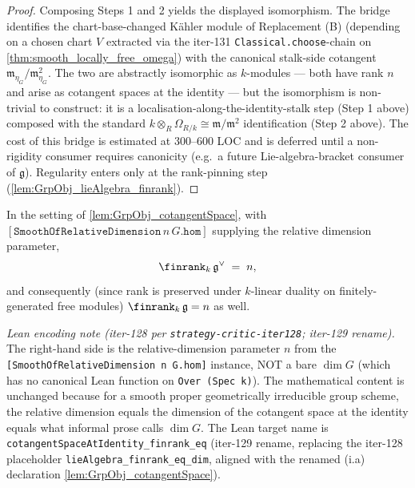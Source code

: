 \begin{proof}
  Composing Steps 1 and 2 yields the displayed isomorphism. The bridge identifies the chart-base-changed Kähler module of Replacement (B) (depending on a chosen chart \(V\) extracted via the iter-131 \texttt{Classical.choose}-chain on \cref{thm:smooth_locally_free_omega}) with the canonical stalk-side cotangent \(\mathfrak m_{\eta_G} / \mathfrak m_{\eta_G}^{2}\). The two are abstractly isomorphic as \(k\)-modules — both have rank \(n\) and arise as cotangent spaces at the identity — but the isomorphism is non-trivial to construct: it is a localisation-along-the-identity-stalk step (Step 1 above) composed with the standard \(k \otimes_{R} \Omega_{R/k} \cong \mathfrak m / \mathfrak m^{2}\) identification (Step 2 above). The cost of this bridge is estimated at 300--600 LOC and is deferred until a non-rigidity consumer requires canonicity (e.g.\ a future Lie-algebra-bracket consumer of \(\mathfrak g\)). Regularity enters only at the rank-pinning step (\cref{lem:GrpObj_lieAlgebra_finrank}).
\end{proof}

\begin{lemma}
  \label{lem:GrpObj_lieAlgebra_finrank}
  
  In the setting of \cref{lem:GrpObj_cotangentSpace}, with \([\mathtt{SmoothOfRelativeDimension}\,n\,G.\mathtt{hom}]\) supplying the relative dimension parameter,
  \[
    \finrank_{k}\,\mathfrak g^{\vee} \;=\; n,
  \]
  and consequently (since rank is preserved under \(k\)-linear duality on finitely-generated free modules) \(\finrank_{k}\,\mathfrak g = n\) as well.

  \emph{Lean encoding note (iter-128 per \texttt{strategy-critic-iter128}; iter-129 rename).} The right-hand side is the relative-dimension parameter \(n\) from the \texttt{[SmoothOfRelativeDimension n G.hom]} instance, NOT a bare \(\dim G\) (which has no canonical Lean function on \texttt{Over (Spec k)}). The mathematical content is unchanged because for a smooth proper geometrically irreducible group scheme, the relative dimension equals the dimension of the cotangent space at the identity equals what informal prose calls \(\dim G\). The Lean target name is \texttt{cotangentSpaceAtIdentity\_finrank\_eq} (iter-129 rename, replacing the iter-128 placeholder \texttt{lieAlgebra\_finrank\_eq\_dim}, aligned with the renamed (i.a) declaration \cref{lem:GrpObj_cotangentSpace}).
\end{lemma}

